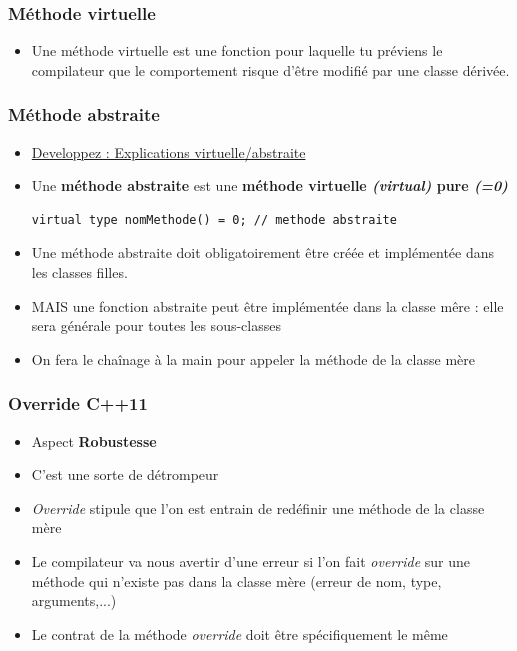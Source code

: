 \documentclass[12pt,a4paper]{article}
\begin{document}
\subsubsection{Méthode virtuelle}
\begin{itemize}
\item Une méthode virtuelle est une fonction pour laquelle tu préviens le compilateur que le comportement risque d'être modifié par une classe dérivée.
\end{itemize}
\subsubsection{Méthode abstraite }
\begin{itemize}
\item \href{https://www.developpez.net/forums/d740612/c-cpp/cpp/debuter/methode-virtuelle-abstraite/}{Developpez : Explications virtuelle/abstraite}
\item Une \textbf{méthode abstraite} est une \textbf{méthode virtuelle \textit{(virtual)} pure \textit{(=0)}}
\begin{lstlisting}
virtual type nomMethode() = 0; // methode abstraite
\end{lstlisting}
\item Une méthode abstraite doit obligatoirement être créée et implémentée dans les classes filles.
\item MAIS une fonction abstraite peut être implémentée dans la classe mêre : elle sera générale pour toutes les sous-classes
\item On fera le chaînage à la main pour appeler la méthode de la classe mère
\end{itemize}
\subsubsection{Override C++11}
\begin{itemize}
\item Aspect \textbf{Robustesse}
\item C'est une sorte de détrompeur
\item \textit{Override} stipule que l'on est entrain de redéfinir une méthode de la classe mère
\item Le compilateur va nous avertir d'une erreur si l'on fait \textit{override} sur une méthode qui n'existe pas dans la classe mère (erreur de nom, type, arguments,...)
\item Le contrat de la méthode \textit{override} doit être spécifiquement le même
\end{itemize}
\end{document}
